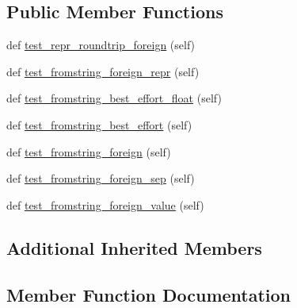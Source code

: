 \subsection*{Public Member Functions}
\begin{DoxyCompactItemize}
\item 
def \hyperlink{classnumpy_1_1core_1_1tests_1_1test__longdouble_1_1TestCommaDecimalPointLocale_ad7a18d4ae96e77d2104c45a9df2a0703}{test\+\_\+repr\+\_\+roundtrip\+\_\+foreign} (self)
\item 
def \hyperlink{classnumpy_1_1core_1_1tests_1_1test__longdouble_1_1TestCommaDecimalPointLocale_ab6022bd5decc922baac39e14d7f3a038}{test\+\_\+fromstring\+\_\+foreign\+\_\+repr} (self)
\item 
def \hyperlink{classnumpy_1_1core_1_1tests_1_1test__longdouble_1_1TestCommaDecimalPointLocale_a7fbd5cfc269a78669b7cbbba4bb22af2}{test\+\_\+fromstring\+\_\+best\+\_\+effort\+\_\+float} (self)
\item 
def \hyperlink{classnumpy_1_1core_1_1tests_1_1test__longdouble_1_1TestCommaDecimalPointLocale_ad674cf1c8c9cbbfb39198c38c8d5dd14}{test\+\_\+fromstring\+\_\+best\+\_\+effort} (self)
\item 
def \hyperlink{classnumpy_1_1core_1_1tests_1_1test__longdouble_1_1TestCommaDecimalPointLocale_af18f28de11dc147be54a54cb6b49a5b8}{test\+\_\+fromstring\+\_\+foreign} (self)
\item 
def \hyperlink{classnumpy_1_1core_1_1tests_1_1test__longdouble_1_1TestCommaDecimalPointLocale_a6075d8a052c224ad140da986e17b3f94}{test\+\_\+fromstring\+\_\+foreign\+\_\+sep} (self)
\item 
def \hyperlink{classnumpy_1_1core_1_1tests_1_1test__longdouble_1_1TestCommaDecimalPointLocale_afd1302ebd2fc7029193de43387c85a50}{test\+\_\+fromstring\+\_\+foreign\+\_\+value} (self)
\end{DoxyCompactItemize}
\subsection*{Additional Inherited Members}


\subsection{Member Function Documentation}
\mbox{\label{classnumpy_1_1core_1_1tests_1_1test__longdouble_1_1TestCommaDecimalPointLocale_ad674cf1c8c9cbbfb39198c38c8d5dd14}} 
